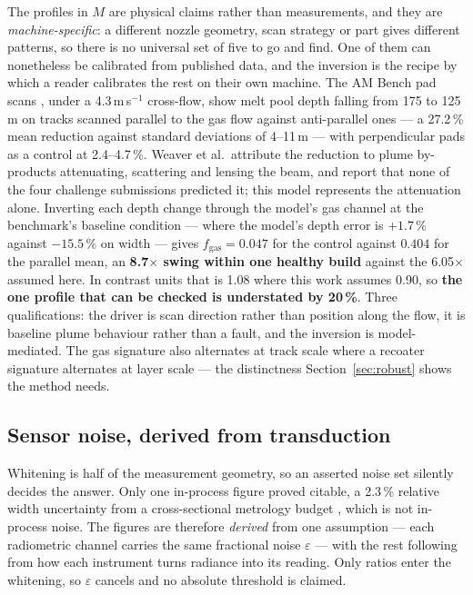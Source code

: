\documentclass[preprint,times]{elsarticle}
\begin{document}
The profiles in $M$ are physical claims rather than measurements, and they are
\emph{machine-specific}: a different nozzle geometry, scan strategy or part gives
different patterns, so there is no universal set of five to go and find. One of
them can nonetheless be calibrated from published data, and the inversion is the
recipe by which a reader calibrates the rest on their own machine. The AM Bench pad scans \cite{Weaver2024}, under a 4.3\,m\,s$^{-1}$ cross-flow,
show melt pool depth falling from 175 to 125\,\textmu m on tracks scanned
parallel to the gas flow against anti-parallel ones --- a 27.2\,\% mean
reduction against standard deviations of 4--11\,\textmu m --- with perpendicular pads as a control at 2.4--4.7\,\%. Weaver et al.\ attribute
the reduction to plume by-products attenuating, scattering and lensing the beam,
and report that none of the four challenge submissions predicted it; this model
represents the attenuation alone. Inverting each depth change
through the model's gas channel at the benchmark's baseline condition --- where
the model's depth error is $+1.7$\,\% against $-15.5$\,\% on width --- gives
$f_{\mathrm{gas}}=0.047$ for the control against $0.404$ for the parallel mean,
an \textbf{8.7$\times$ swing within one healthy build} against the 6.05$\times$
assumed here. In contrast units that is 1.08 where this work assumes 0.90, so
\textbf{the one profile that can be checked is understated by 20\,\%}. Three qualifications: the driver is scan direction rather than position along the
flow, it is baseline plume behaviour rather than a fault, and the inversion is
model-mediated. The gas signature also alternates at track scale where a recoater
signature alternates at layer scale --- the distinctness
Section~\ref{sec:robust} shows the method needs.

\subsection{Sensor noise, derived from transduction}
\label{sec:noise}

Whitening is half of the measurement geometry, so an asserted noise set silently
decides the answer. Only one in-process figure proved citable, a 2.3\,\% relative
width uncertainty from a cross-sectional metrology budget \cite{Weaver2024},
which is not in-process noise. The figures are therefore \emph{derived} from one
assumption --- each radiometric channel carries the same fractional noise
$\varepsilon$ --- with the rest following from how each instrument turns radiance
into its reading. Only ratios enter the whitening, so $\varepsilon$ cancels and
no absolute threshold is claimed.
\end{document}
